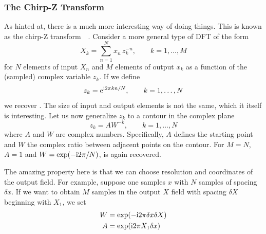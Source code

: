 \subsubsection{The Chirp-Z Transform}
As hinted at, there is a much more interesting way of doing things.  This
is known as the chirp-Z
transform~\cite{rabiner1969chirp}~\cite{rabiner1969chirp2}.
Consider a more general type of DFT of the form
\begin{equation}
X_k = \sum_{n=1}^{N} x_n\, z_k^{-n}, \qquad k=1,\ldots,M
\label{eqn:czt}
\end{equation}
for $N$ elements of input $X_n$ and $M$ elements of output $x_k$ as a
function of the (sampled) complex variable  $z_k$. If we define
\begin{equation}
z_k = {\mathrm{e}}^{{\mathrm{i}} 2\pi k n/N}, \qquad k=1,\ldots,N
\end{equation}
we recover .  The size of input and output
elements is not the same, which it itself is interesting.  Let us now
generalize $z_k$ to a contour in the complex plane
\begin{equation}
z_k = A W^{-k}, \qquad k=1,\ldots,N
\end{equation}
where $A$ and $W$ are complex numbers.  Specifically, $A$ defines the
starting point and $W$ the complex ratio between adjacent points on the
contour.  For $M=N$, $A=1$ and $W=\exp(-{\mathrm{i}} 2 \pi/N)$, 
is again recovered.  

The amazing property here is that we can choose resolution and coordinates
of the output field.  For example, suppose one samples $x$ with $N$ samples
of spacing $\delta x$.  If we want to obtain $M$ samples in the output
$X$ field with spacing $\delta X$ beginning with $X_1$, we set
\begin{align}
								W&=\exp(-{\mathrm{i}} 2 \pi \delta x \delta X)\\
								A&=\exp( {\mathrm{i}} 2 \pi X_1 \delta x)
\end{align}

